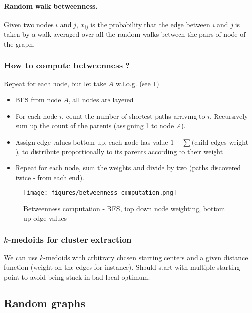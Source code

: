 \paragraph{Random walk betweenness.}
  Given two nodes $i$ and $j$, $x_{ij}$ is the probability that the edge between $i$ and $j$ is taken by a walk averaged over all the random walks between the pairs of node of the graph.


\subsubsection{How to compute betweenness ?} 

Repeat for each node, but let take $A$ w.l.o.g. (see \cref{fig:betweenness})

\begin{itemize}
  \item BFS from node $A$, all nodes are layered
  \item For each node $i$, count the number of shortest paths arriving to $i$. Recursively sum up the count of the parents (assigning 1 to node $A$).
  \item Assign edge values bottom up, each node has value $1 + \sum ($child edges weight$)$, to distribute proportionally to its parents according to their weight
  \item Repeat for each node, sum the weights and divide by two (paths discovered twice - from each end).
\end{itemize}


\begin{figure}
  \centering
  \texttt{[image: figures/betweenness\_computation.png]}
  \caption{Betweenness computation - BFS, top down node weighting, bottom up edge values}
  \label{fig:betweenness}
\end{figure}

\subsubsection{$k$-medoids for cluster extraction}

We can use $k$-medoids with arbitrary chosen starting centers and a given distance function (weight on the edges for instance). Should start with multiple starting point to avoid being stuck in bad local optimum.

\subsection{Random graphs}

